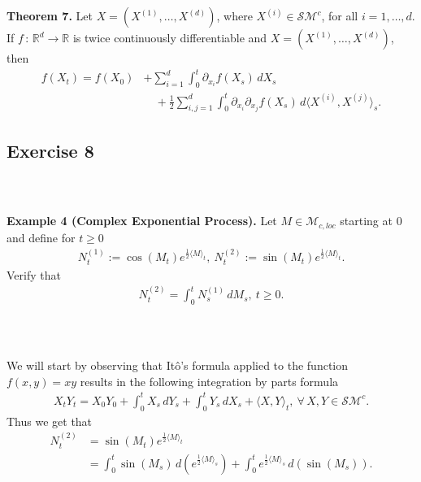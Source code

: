\documentclass{beamer}
\numberwithin{equation}{section}
\newenvironment{frame2}{\begin{frame}\frametitle{{\normalsize \secname} \\ {\large \subsecname}}}{\end{frame}}
\begin{document}
\begin{frame2}
    \textbf{Theorem 7.}
        Let $X = (X^{(1)},\ldots,X^{(d)})$, where $X^{(i)} \in \mathcal{SM}^c$, for all $i = 1,\ldots,d$.
        If $f \, : \, \mathbb{R}^d \rightarrow \mathbb{R}$ is twice continuously differentiable and $X = (X^{(1)},\ldots,X^{(d)})$, then
        \begin{align*}
            f(X_t) = f(X_0) &+ \sum_{i = 1}^d\int_0^t\partial_{x_i}f(X_s)\, dX_s \\
            &\quad+ \frac{1}{2}\sum_{i,j=1}^d\int_0^t\partial_{x_i}\partial_{x_j}f(X_s)\, d \langle X^{(i)},X^{(j)}\rangle_s.
        \end{align*}
\end{frame2}

\subsection{Exercise 8}

\begin{frame2}
    \textbf{Example 4 (Complex Exponential Process).}
    Let $M \in \mathcal{M}_{c,loc}$ starting at 0 and define for $t \geq 0$
    \begin{align}
        N_t^{(1)} := \cos(M_t)e^{\frac{1}{2}\langle M \rangle_t},\ N_t^{(2)} := \sin(M_t)e^{\frac{1}{2}\langle M \rangle_t}.
    \end{align}
    Verify that
    \begin{align}
        N_t^{(2)} = \int_0^t N_s^{(1)} \, dM_s, \ t \geq 0.
    \end{align}
\end{frame2}

\begin{frame2}
    We will start by observing that Itô's formula applied to the function $f(x,y) = xy$ results in the following integration by parts formula
    \begin{align*}
        X_tY_t = X_0Y_0 + \int_0^t X_s \, dY_s + \int_0^tY_s\, dX_s + \langle X,Y \rangle_t, \ \forall\, X,Y \in \mathcal{SM}^c.
    \end{align*}
    Thus we get that
    \begin{align}
         N_t^{(2)} &= \sin(M_t)e^{\frac{1}{2}\langle M \rangle_t} \\
        &= \int_0^t \sin(M_s) \, d\left(e^{\frac{1}{2}\langle M \rangle_s}\right) + \int_0^t e^{\frac{1}{2}\langle M \rangle_s} \, d \left(\sin(M_s)\right).
    \end{align}
\end{frame2}
\end{document}
